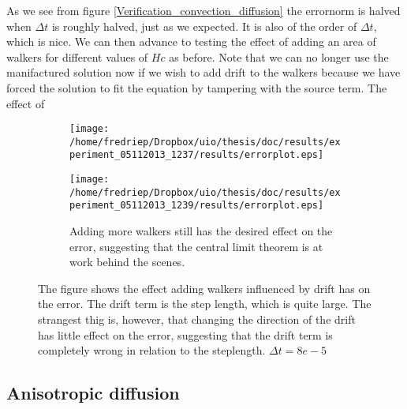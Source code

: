 As we see from figure \ref{Verification_convection_diffusion} the errornorm is halved when $\Delta t$ is roughly halved, just as we expected. It is also of the order of $\Delta t$, which is nice.  
We can then advance to testing the effect of adding an area of walkers for different values of $Hc$ as before. 
Note that we can no longer use the manifactured solution now if we wish to add drift to the walkers because we have forced the solution to fit the equation by tampering with the source term. 
The effect of
\begin{figure}[H]
\centering
\begin{subfigure}[b]{0.48\textwidth}
\texttt{[image: /home/fredriep/Dropbox/uio/thesis/doc/results/experiment\_05112013\_1237/results/errorplot.eps]}
\caption{}
\label{Errortest_convection_diffusion_walkers:few_walkers}
\end{subfigure}
\begin{subfigure}[b]{0.48\textwidth}
\texttt{[image: /home/fredriep/Dropbox/uio/thesis/doc/results/experiment\_05112013\_1239/results/errorplot.eps]}
\caption{Adding more walkers still has the desired effect on the error, suggesting that the central limit theorem is at work behind the scenes.}
\label{Errortest_convection_diffusion_walkers:more_walkers}
\end{subfigure}
\caption[Adding walkers influenced by drift]{The figure shows the effect adding walkers influenced by drift has on the error. 
The drift term is the step length, which is quite large. The strangest thig is, however, that changing the direction of the drift has little effect on the error, suggesting that the drift term is completely wrong in relation to the steplength. $\Delta t =8e-5$}
\label{Errortest_convection_diffusion_walkers}
\end{figure}



\subsection{Anisotropic diffusion}

